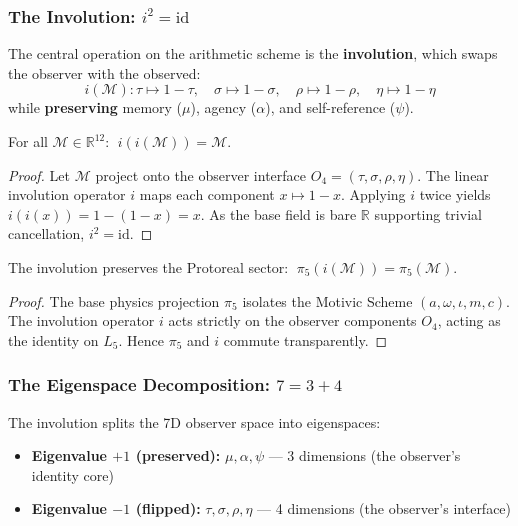 \subsubsection{The Involution: $i^2 = \mathrm{id}$}

The central operation on the arithmetic scheme is the \textbf{involution}, which swaps the observer with the observed:
\begin{equation}
    i(\mathcal{M}) : \tau \mapsto 1 - \tau, \quad \sigma \mapsto 1 - \sigma, \quad \rho \mapsto 1 - \rho, \quad \eta \mapsto 1 - \eta
\end{equation}
while \textbf{preserving} memory ($\mu$), agency ($\alpha$), and self-reference ($\psi$).

\begin{theorem}
\label{thm:involute}
For all $\mathcal{M} \in \mathbb{R}^{12}$: $\;i(i(\mathcal{M})) = \mathcal{M}$.
\end{theorem}
\begin{proof}
Let $\mathcal{M}$ project onto the observer interface $O_4 = (\tau, \sigma, \rho, \eta)$. The linear involution operator $i$ maps each component $x \mapsto 1 - x$. Applying $i$ twice yields $i(i(x)) = 1 - (1 - x) = x$. As the base field is bare $\mathbb{R}$ supporting trivial cancellation, $i^2 = \mathrm{id}$. \qedhere
\end{proof}

\begin{theorem}
The involution preserves the Protoreal sector: $\;\pi_5(i(\mathcal{M})) = \pi_5(\mathcal{M})$.
\end{theorem}
\begin{proof}
The base physics projection $\pi_5$ isolates the Motivic Scheme $(a, \omega, \iota, m, c)$. The involution operator $i$ acts strictly on the observer components $O_4$, acting as the identity on $L_5$. Hence $\pi_5$ and $i$ commute transparently. \qedhere
\end{proof}

\subsubsection{The Eigenspace Decomposition: $7 = 3 + 4$}

The involution splits the 7D observer space into eigenspaces:
\begin{itemize}
    \item \textbf{Eigenvalue $+1$ (preserved):} $\mu, \alpha, \psi$ --- 3 dimensions (the observer's identity core)
    \item \textbf{Eigenvalue $-1$ (flipped):} $\tau, \sigma, \rho, \eta$ --- 4 dimensions (the observer's interface)
\end{itemize}

